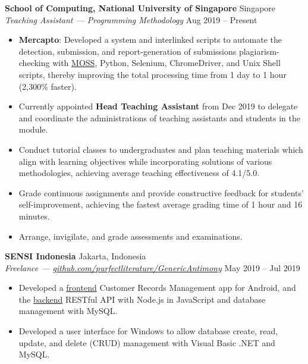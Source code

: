 \documentclass[a4paper, 11pt]{article}
\newcommand{\intraspace}{\vspace{5pt}}
\begin{document}
	\intraspace
	
	\textbf{School of Computing, National University of Singapore} \hfill Singapore\\
	\textit{Teaching Assistant --- Programming Methodology} \hfill Aug 2019 -- Present
	\begin{itemize}[leftmargin=*, noitemsep, topsep=0pt]
		\item \textbf{Mercapto}: Developed a system and interlinked scripts to automate the detection, submission, and report-generation of submissions plagiarism-checking with \href{http://theory.stanford.edu/~aiken/moss/}{MOSS}, Python, Selenium, ChromeDriver, and Unix Shell scripts, thereby improving the total processing time from 1 day to 1 hour (2,300\% faster).
		\item Currently appointed \textbf{Head Teaching Assistant} from Dec 2019 to delegate and coordinate the administrations of teaching assistants and students in the module.
		\item Conduct tutorial classes to undergraduates and plan teaching materials which align with learning objectives while incorporating solutions of various methodologies, achieving average teaching effectiveness of 4.1/5.0.
		\item Grade continuous assignments and provide constructive feedback for students’ self-improvement, achieving the fastest average grading time of 1 hour and 16 minutes.
		\item Arrange, invigilate, and grade assessments and examinations.
	\end{itemize}
	
	\intraspace
	
	\textbf{SENSI Indonesia} \hfill Jakarta, Indonesia\\
	\textit{Freelance --- \href{https://github.com/purfectliterature/GenericAntimony}{github.com/purfectliterature/GenericAntimony}} \hfill May 2019 -- Jul 2019
	\begin{itemize}[leftmargin=*, noitemsep, topsep=0pt]
		\item Developed a \href{https://github.com/purfectliterature/GenericAntimony}{frontend} Customer Records Management app for Android, and the \href{https://github.com/purfectliterature/GenericAntimonyBackend}{backend} RESTful API with Node.js in JavaScript and database management with MySQL.
		\item Developed a user interface for Windows to allow database create, read, update, and delete (CRUD) management with Visual Basic .NET and MySQL.
	\end{itemize}
	
\end{document}
